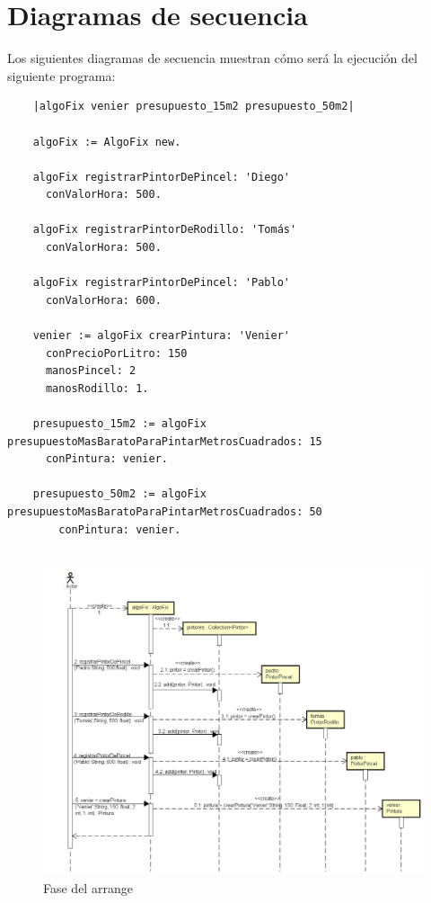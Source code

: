 \documentclass[titlepage,a4paper]{article}
\begin{document}
\section{Diagramas de secuencia}\label{sec:diagramasdesecuencia}

Los siguientes diagramas de secuencia muestran cómo será la ejecución del siguiente programa:
\begin{verbatim}
	|algoFix venier presupuesto_15m2 presupuesto_50m2|
	
	algoFix := AlgoFix new.
	
	algoFix registrarPintorDePincel: 'Diego'
	  conValorHora: 500.
	  
	algoFix registrarPintorDeRodillo: 'Tomás'
	  conValorHora: 500.
	
	algoFix registrarPintorDePincel: 'Pablo'
	  conValorHora: 600.
	
	venier := algoFix crearPintura: 'Venier'
	  conPrecioPorLitro: 150
	  manosPincel: 2
	  manosRodillo: 1.
	
	presupuesto_15m2 := algoFix presupuestoMasBaratoParaPintarMetrosCuadrados: 15
	  conPintura: venier.
    
	presupuesto_50m2 := algoFix presupuestoMasBaratoParaPintarMetrosCuadrados: 50
	    conPintura: venier.
    
\end{verbatim}

\begin{figure}[H]
\centering
\includegraphics[width=1\textwidth]{Secuencia1Arrange.png}
\caption{\label{fig:seq01} Fase del arrange}
\end{figure}
\end{document}
